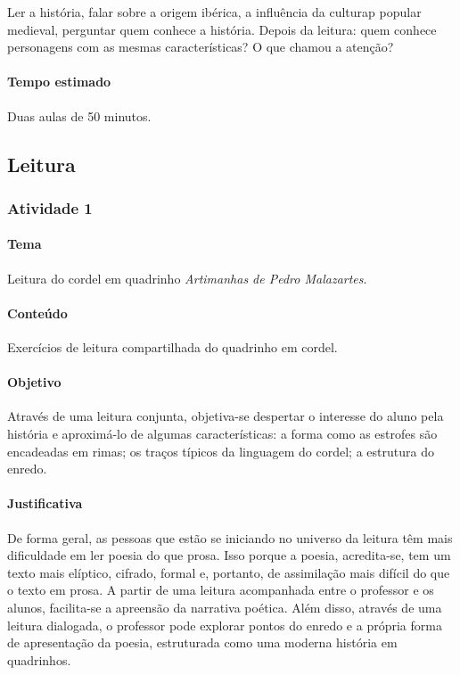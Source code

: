 \documentclass[11pt]{extarticle}
\begin{document}
Ler a história, falar sobre a origem ibérica, a influência da culturap popular medieval, perguntar quem conhece a história.
Depois da leitura: quem conhece personagens com as mesmas características? O que chamou a atenção?

\paragraph{Tempo estimado} Duas aulas de 50 minutos.



\subsection{Leitura}

\subsubsection{Atividade 1}


\paragraph{Tema} Leitura do cordel em quadrinho \textit{Artimanhas de Pedro Malazartes}.

\paragraph{Conteúdo} Exercícios de leitura compartilhada do quadrinho em cordel.


\paragraph{Objetivo} Através de uma leitura conjunta, objetiva-se despertar o interesse do aluno pela história e aproximá-lo de algumas características: a forma como as estrofes são encadeadas em rimas; os traços típicos da linguagem do cordel; a estrutura do enredo.

\paragraph{Justificativa} De forma geral, as pessoas que estão se iniciando no universo da leitura têm mais dificuldade em ler poesia do que prosa. Isso porque a poesia, acredita-se, tem um texto mais elíptico, cifrado, formal e, portanto, de assimilação mais difícil do que o texto em prosa. A partir de uma leitura acompanhada entre o professor e os alunos, facilita-se a apreensão da narrativa poética. Além disso, através de uma leitura dialogada, o professor pode explorar pontos do enredo e a própria forma de apresentação da poesia, estruturada como uma moderna história em quadrinhos.
\end{document}
